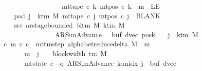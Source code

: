 \begin{isabellebody}
\ \ \ \ \ \ \ \ \ \ \ \ \ \ \ \ \ \ \ \ {\isasymlongrightarrow}\ mt{\isacharunderscore}{\kern0pt}tape\ c{}\ k\ {\isacharparenleft}{\kern0pt}mt{\isacharunderscore}{\kern0pt}pos\ c{}\ k\ {\isacharminus}{\kern0pt}\ m{\isacharparenright}{\kern0pt}\ {\isasymnoteq}\ LE{}{\isachardoublequoteclose}\isanewline
\ \ \ \ \ \ \ pad{}{\isacharcolon}{\kern0pt}\ {\isachardoublequoteopen}{\isasymforall}j\ {\isasymge}\ k{\isacharunderscore}{\kern0pt}tm\ M{\isachardot}{\kern0pt}\ mt{\isacharunderscore}{\kern0pt}tape\ c{}\ j\ {\isacharparenleft}{\kern0pt}mt{\isacharunderscore}{\kern0pt}pos\ c{}\ j{\isacharparenright}{\kern0pt}\ {\isacharequal}{\kern0pt}\ BLANK{}{\isachardoublequoteclose}\isanewline
\ \ \ \ \ \ \ src{}{\isacharcolon}{\kern0pt}\ {\isachardoublequoteopen}ar{\isacharunderscore}{\kern0pt}stage{\isacharunderscore}{\kern0pt}bounded\ {\isacharparenleft}{\kern0pt}bl{\isacharunderscore}{\kern0pt}tm\ M{\isacharparenright}{\kern0pt}\ {\isacharparenleft}{\kern0pt}k{\isacharunderscore}{\kern0pt}tm\ M{\isacharparenright}{\kern0pt}\isanewline
\ \ \ \ \ \ \ \ \ \ \ \ \ \ \ \ \ \ \ {\isacharparenleft}{\kern0pt}AR{\isacharunderscore}{\kern0pt}SimAdvance{\isacharcomma}{\kern0pt}\ {}{\isacharcomma}{\kern0pt}\ {}{\isacharcomma}{\kern0pt}\ buf{}{\isacharcomma}{\kern0pt}\ dvec{\isacharcomma}{\kern0pt}\ posk{}{\isacharparenright}{\kern0pt}{\isachardoublequoteclose}\isanewline
\ \ \ {\isachardoublequoteopen}j\ {\isasymle}\ k{\isacharunderscore}{\kern0pt}tm\ M\ {\isacharminus}{\kern0pt}\ {}\ {\isasymLongrightarrow}\isanewline
\ \ \ \ {\isacharparenleft}{\kern0pt}{\isasymexists}c\ m{\isachardot}{\kern0pt}\ {\isacharparenleft}{\kern0pt}c{}{\isacharcomma}{\kern0pt}\ c{\isacharparenright}{\kern0pt}\ {\isasymin}\ {\isacharparenleft}{\kern0pt}mttm{\isacharunderscore}{\kern0pt}step\ {\isacharparenleft}{\kern0pt}alphabet{\isacharunderscore}{\kern0pt}reduce{\isacharunderscore}{\kern0pt}delta\ M{\isacharparenright}{\kern0pt}{\isacharparenright}{\kern0pt}\ {\isacharcircum}{\kern0pt}{\isacharcircum}{\kern0pt}\ m\isanewline
\ \ \ \ \ \ \ \ \ {\isasymand}\ m\ {\isasymle}\ j\ {\isacharasterisk}{\kern0pt}\ {\isacharparenleft}{\kern0pt}{}\ {\isacharasterisk}{\kern0pt}\ block{\isacharunderscore}{\kern0pt}width\ {\isacharparenleft}{\kern0pt}{\isasymGamma}{\isacharunderscore}{\kern0pt}tm\ M{\isacharparenright}{\kern0pt}{\isacharparenright}{\kern0pt}\isanewline
\ \ \ \ \ \ \ \ \ {\isasymand}\ mt{\isacharunderscore}{\kern0pt}state\ c\ {\isacharequal}{\kern0pt}\ {\isacharparenleft}{\kern0pt}q{\isacharcomma}{\kern0pt}\ AR{\isacharunderscore}{\kern0pt}SimAdvance{\isacharcomma}{\kern0pt}\ k{\isacharunderscore}{\kern0pt}unidx\ j{\isacharcomma}{\kern0pt}\ {}{\isacharcomma}{\kern0pt}\ buf{}{\isacharcomma}{\kern0pt}\ dvec{\isacharcomma}{\kern0pt}\isanewline

\end{isabellebody}
